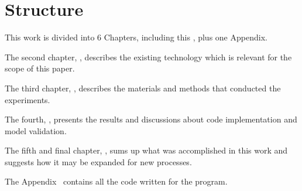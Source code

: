 	\section{Structure}
	
	This work is divided into 6 Chapters, including this \textbf{}, plus one Appendix.
	
	The second chapter, \textbf{}, describes the existing technology which is relevant for the scope of this paper.

	The third chapter, \textbf{}, describes the materials and methods that conducted the experiments.
	
	The fourth, \textbf{}, presents the results and discussions about code implementation and model validation.
	
	The fifth and final chapter, \textbf{}, sums up what was accomplished in this work and suggests how it may be expanded for new processes.
	
	The Appendix~\textbf{} contains all the code written for the program.